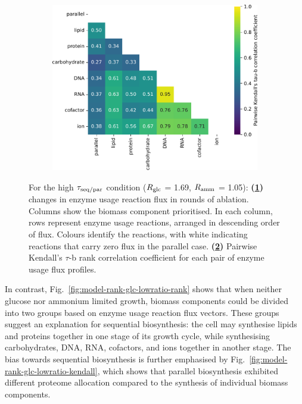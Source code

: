 \begin{figure}
\begin{subfigure}[t]{0.45\textwidth}
    \caption{
    }
    \label{fig:model-rank-glc-highratio-rank}
  \end{subfigure}%
  \begin{subfigure}[t]{0.45\textwidth}
  \centering
    \includegraphics[width=\linewidth]{CompareEnzUse_glc01p69_pyrUnres_amm01p05_2.pdf}
    \caption{
    }
    \label{fig:model-rank-glc-highratio-kendall}
  \end{subfigure}%

  \caption[
    Changes in enzyme usage reaction flux and Kendall's $\tau$-b rank correlation coefficient for each pair, $\exchrate{glc}$ = \SI{1.69}{\mmolgdwh}, $\exchrate{amm}$ = \SI{1.05}{\mmolgdwh}.
    ]{
    For the high $\tau_{\mathrm{seq}/\mathrm{par}}$ condition ($\exchrate{glc}$ = \SI{1.69}{\mmolgdwh}, $\exchrate{amm}$ = \SI{1.05}{\mmolgdwh}):
    \textbf{(\ref{fig:model-rank-glc-highratio-rank})}
    changes in enzyme usage reaction flux in rounds of ablation.
    Columns show the biomass component prioritised.
    In each column, rows represent enzyme usage reactions, arranged in descending order of flux.
    Colours identify the reactions, with white indicating reactions that carry zero flux in the parallel case.
    \textbf{(\ref{fig:model-rank-glc-highratio-kendall})}
    Pairwise Kendall's $\tau$-b rank correlation coefficient \parencite{kendallTREATMENTTIESRANKING1945} for each pair of enzyme usage flux profiles.
  }
  \label{fig:model-rank-glc-highratio}
\end{figure}

In contrast, Fig.\ \ref{fig:model-rank-glc-lowratio-rank} shows that when neither glucose nor ammonium limited growth, biomass components could be divided into two groups based on enzyme usage reaction flux vectors.
These groups suggest an explanation for sequential biosynthesis: the cell may synthesise lipids and proteins together in one stage of its growth cycle, while synthesising carbohydrates, DNA, RNA, cofactors, and ions together in another stage.
The bias towards sequential biosynthesis is further emphasised by Fig.\ \ref{fig:model-rank-glc-lowratio-kendall}, which shows that parallel biosynthesis exhibited different proteome allocation compared to the synthesis of individual biomass components.

